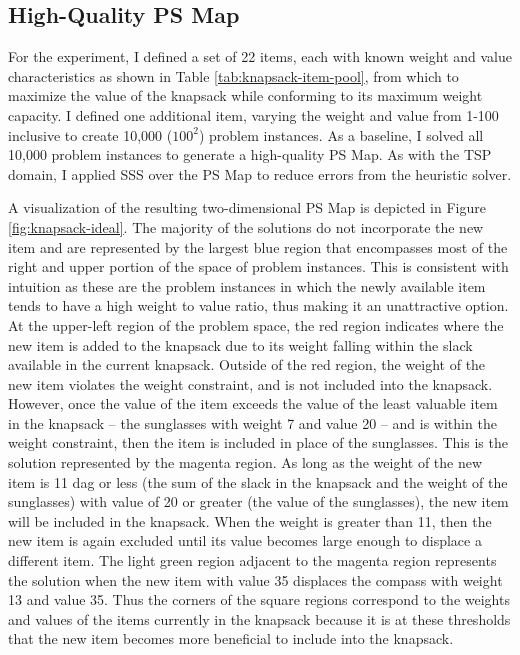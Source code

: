 \subsection{High-Quality PS Map} For the  experiment, I defined a set of 22 items, each with known weight and value characteristics as shown in Table \ref{tab:knapsack-item-pool}, from which to maximize the value of the knapsack while conforming to its maximum weight capacity.  I defined one additional item, varying the weight and value from 1-100 inclusive to create 10,000 ($\textrm{100}^{\textrm{2}}$) problem instances.  As a baseline, I solved all 10,000 problem instances to generate a high-quality PS Map.  As with the TSP domain, I applied SSS over the PS Map to reduce errors from the heuristic solver.  

A visualization of the resulting two-dimensional PS Map is depicted in Figure \ref{fig:knapsack-ideal}.  The majority of the solutions do not incorporate the new item and are represented by the largest blue region that encompasses most of the right and upper portion of the space of problem instances.  This is consistent with intuition as these are the problem instances in which the newly available item tends to have a high weight to value ratio, thus making it an unattractive option.  At the upper-left region of the problem space, the red region indicates where the new item is added to the knapsack due to its weight falling within the slack available in the current knapsack.  Outside of the red region, the weight of the new item violates the weight constraint, and is not included into the knapsack.  However, once the value of the item exceeds the value of the least valuable item in the knapsack -- the sunglasses with weight 7 and value 20 -- and is within the weight constraint, then the item is included in place of the sunglasses.  This is the solution represented by the magenta region.  As long as the weight of the new item is 11 dag or less (the sum of the slack in the knapsack and the weight of the sunglasses) with value of 20 or greater (the value of the sunglasses), the new item will be included in the knapsack.  When the weight is greater than 11, then the new item is again excluded until its value becomes large enough to displace a different item.  The light green region adjacent to the magenta region represents the solution when the new item with value 35 displaces the compass with weight 13 and value 35.  Thus the corners of the square regions correspond to the weights and values of the items currently in the knapsack because it is at these thresholds that the new item becomes more beneficial to include into the knapsack.


